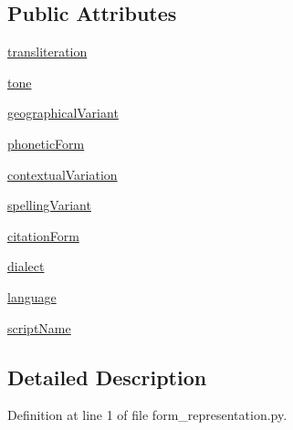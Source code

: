 \subsection*{Public Attributes}
\begin{DoxyCompactItemize}
\item 
\hyperlink{classsrc_1_1resources_1_1form__representation_1_1_form_representation_aad9c6d346c2db9cab19ae474c8be1f32}{transliteration}
\item 
\hyperlink{classsrc_1_1resources_1_1form__representation_1_1_form_representation_ae7cab7f157f6b30d6e666f8a6167b42c}{tone}
\item 
\hyperlink{classsrc_1_1resources_1_1form__representation_1_1_form_representation_aadafefc92165aefaffdd0a36e3f2fe17}{geographical\+Variant}
\item 
\hyperlink{classsrc_1_1resources_1_1form__representation_1_1_form_representation_a9b6f6c1e0cb542eb5c705eb34600c5bd}{phonetic\+Form}
\item 
\hyperlink{classsrc_1_1resources_1_1form__representation_1_1_form_representation_aa32a9de14f30ff1d1b568647c36a72d0}{contextual\+Variation}
\item 
\hyperlink{classsrc_1_1resources_1_1form__representation_1_1_form_representation_ac063748020f6caa0bd1e8f46b4b084a2}{spelling\+Variant}
\item 
\hyperlink{classsrc_1_1resources_1_1form__representation_1_1_form_representation_a76aaf527b9bbb561c6130d02521f8709}{citation\+Form}
\item 
\hyperlink{classsrc_1_1resources_1_1form__representation_1_1_form_representation_a19c9c2d4904b5dbadfdf2ce32ba622b0}{dialect}
\item 
\hyperlink{classsrc_1_1resources_1_1form__representation_1_1_form_representation_aa993aab1241e9c24be14a2fd6e227fd2}{language}
\item 
\hyperlink{classsrc_1_1resources_1_1form__representation_1_1_form_representation_a95bdf03ceaf26ab90677cae7fdb3d784}{script\+Name}
\end{DoxyCompactItemize}


\subsection{Detailed Description}


Definition at line 1 of file form\+\_\+representation.\+py.



